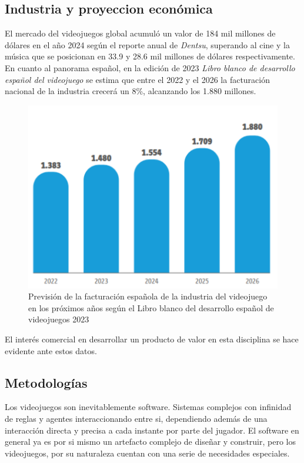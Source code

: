 \subsection{Industria y proyeccion económica}

El mercado del videojuegos global acumuló un valor de 184 mil millones de dólares en el año 2024 según el reporte anual de \textit{Dentsu}, superando al cine y la música que se posicionan en 33.9 y 28.6 mil millones de dólares respectivamente. En cuanto al panorama español, en la edición de 2023 \textit{Libro blanco de desarrollo español del videojuego} se estima que entre el 2022 y el 2026 la facturación nacional de la industria crecerá un 8\%, alcanzando los 1.880 millones.

\begin{figure}[h]
    \centering
    \includegraphics[scale=0.5]{img/prevision_libroblanco.png}
    \caption[Previsión de facturación española de videojuegos]{Previsión de la facturación española de la industria del videojuego en los próximos años según el Libro blanco del desarrollo español de videojuegos 2023}
    \label{fig:prevlibroblanco}
\end{figure}

El interés comercial en desarrollar un producto de valor en esta disciplina se hace evidente ante estos datos.

\subsection{Metodologías}

Los videojuegos son inevitablemente software. Sistemas complejos con infinidad de reglas y agentes interaccionando entre si, dependiendo además de una interacción directa y precisa a cada instante por parte del jugador. El software en general ya es por si mismo un artefacto complejo de diseñar y construir, pero los videojuegos, por su naturaleza cuentan con una serie de necesidades especiales.

